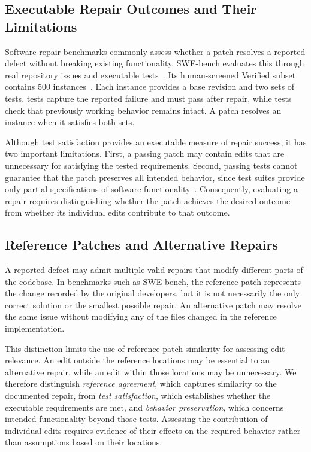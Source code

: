 \documentclass[a4paper,fleqn]{cas-sc}
\newcommand{\code}[1]{\texttt{\detokenize{#1}}}
\begin{document}
\subsection{Executable Repair Outcomes and Their Limitations}
\label{sec:repair-outcomes}

Software repair benchmarks commonly assess whether a patch resolves a reported defect without breaking existing functionality. SWE-bench evaluates this through real repository issues and executable tests~\citep{jimenez2024swebench}. Its human-screened Verified subset contains 500 instances~\citep{chowdhury2024verified}. Each instance provides a base revision and two sets of tests. \code{FAIL_TO_PASS} tests capture the reported failure and must pass after repair, while \code{PASS_TO_PASS} tests check that previously working behavior remains intact. A patch resolves an instance when it satisfies both sets.

Although test satisfaction provides an executable measure of repair success, it has two important limitations. First, a passing patch may contain edits that are unnecessary for satisfying the tested requirements. Second, passing tests cannot guarantee that the patch preserves all intended behavior, since test suites provide only partial specifications of software functionality~\citep{barr2015oracle}. Consequently, evaluating a repair requires distinguishing whether the patch achieves the desired outcome from whether its individual edits contribute to that outcome.


\subsection{Reference Patches and Alternative Repairs}
\label{sec:reference-patches}

A reported defect may admit multiple valid repairs that modify different parts of the codebase. In benchmarks such as SWE-bench, the reference patch represents the change recorded by the original developers, but it is not necessarily the only correct solution or the smallest possible repair. An alternative patch may resolve the same issue without modifying any of the files changed in the reference implementation.

This distinction limits the use of reference-patch similarity for assessing edit relevance. An edit outside the reference locations may be essential to an alternative repair, while an edit within those locations may be unnecessary. We therefore distinguish \emph{reference agreement}, which captures similarity to the documented repair, from \emph{test satisfaction}, which establishes whether the executable requirements are met, and \emph{behavior preservation}, which concerns intended functionality beyond those tests. Assessing the contribution of individual edits requires evidence of their effects on the required behavior rather than assumptions based on their locations.
\end{document}
